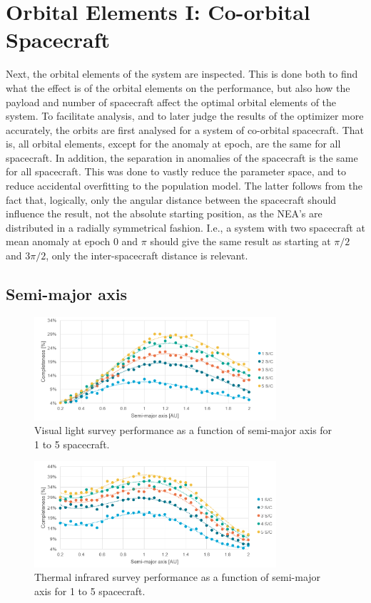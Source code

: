 \section{Orbital Elements I: Co-orbital Spacecraft}
\label{sec:results_orbits_one}
Next, the orbital elements of the system are inspected. This is done both to find what the effect is of the orbital elements on the performance, but also how the payload and number of spacecraft affect the optimal orbital elements of the system. To facilitate analysis, and to later judge the results of the optimizer more accurately, the orbits are first analysed for a system of co-orbital spacecraft. That is, all orbital elements, except for the anomaly at epoch, are the same for all spacecraft. In addition, the separation in anomalies of the spacecraft is the same for all spacecraft. This was done to vastly reduce the parameter space, and to reduce accidental overfitting to the population model. The latter follows from the fact that, logically, only the angular distance between the spacecraft should influence the result, not the absolute starting position, as the NEA's are distributed in a radially symmetrical fashion. I.e., a system with two spacecraft at mean anomaly at epoch $0$ and $\pi$ should give the same result as starting at $\pi/2$ and $3\pi/2$, only the inter-spacecraft distance is relevant.\\

\subsection{Semi-major axis}

\begin{figure}[htbp]
 \centering
 \includegraphics[width=0.8\textwidth]{img/vis_semi_maj.png}
 \caption{Visual light survey performance as a function of semi-major axis for 1 to 5 spacecraft.}
 \label{fig:vis_semi_maj}
\end{figure}

\begin{figure}[htbp]
 \centering
 \includegraphics[width=0.8\textwidth]{img/tir_semi_maj.png}
 \caption{Thermal infrared survey performance as a function of semi-major axis for 1 to 5 spacecraft.}
 \label{fig:tir_semi_maj}
\end{figure}

